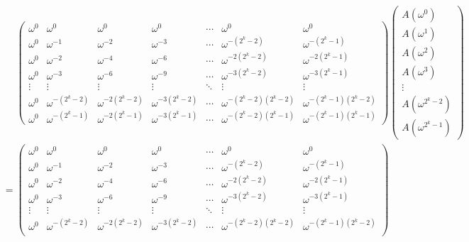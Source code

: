 \begin{align*}
&\phantom{= }
\begin{pmatrix}
\omega^0 & \omega^0 & \omega^0 & \omega^0 & \cdots & \omega^0 & \omega^0 \\ 
\omega^0 & \omega^{-1} & \omega^{-2} & \omega^{-3} & \cdots & \omega^{-(2^k-2)} & \omega^{-(2^k-1)} \\ 
\omega^0 & \omega^{-2} & \omega^{-4} & \omega^{-6} & \cdots & \omega^{-2(2^k-2)} & \omega^{-2(2^k-1)} \\ 
\omega^0 & \omega^{-3} & \omega^{-6} & \omega^{-9} & \cdots & \omega^{-3(2^k-2)} & \omega^{-3(2^k-1)} \\ 
\vdots   & \vdots   & \vdots   & \vdots   & \ddots & \vdots            & \vdots            \\
\omega^0 & \omega^{-(2^k - 2)} & \omega^{-2(2^k - 2)} & \omega^{-3(2^k - 2)} & \cdots & \omega^{-(2^k - 2)(2^k-2)} & \omega^{-(2^k-1)(2^k - 2)} \\ 
\omega^0 & \omega^{-(2^k - 1)} & \omega^{-2(2^k - 1)} & \omega^{-3(2^k - 1)} & \cdots & \omega^{-(2^k - 2)(2^k-1)} & \omega^{-(2^k-1)(2^k - 1)}
\end{pmatrix}
\begin{pmatrix}
A(\omega^0) \\ 
A(\omega^1) \\ 
A(\omega^2) \\ 
A(\omega^3) \\ 
\vdots \\
A(\omega^{2^k - 2}) \\
A(\omega^{2^k - 1})
\end{pmatrix}
\\
&=
\begin{pmatrix}
\omega^0 & \omega^0 & \omega^0 & \omega^0 & \cdots & \omega^0 & \omega^0 \\ 
\omega^0 & \omega^{-1} & \omega^{-2} & \omega^{-3} & \cdots & \omega^{-(2^k-2)} & \omega^{-(2^k-1)} \\ 
\omega^0 & \omega^{-2} & \omega^{-4} & \omega^{-6} & \cdots & \omega^{-2(2^k-2)} & \omega^{-2(2^k-1)} \\ 
\omega^0 & \omega^{-3} & \omega^{-6} & \omega^{-9} & \cdots & \omega^{-3(2^k-2)} & \omega^{-3(2^k-1)} \\ 
\vdots   & \vdots   & \vdots   & \vdots   & \ddots & \vdots            & \vdots            \\
\omega^0 & \omega^{-(2^k - 2)} & \omega^{-2(2^k - 2)} & \omega^{-3(2^k - 2)} & \cdots & \omega^{-(2^k - 2)(2^k-2)} & \omega^{-(2^k-1)(2^k - 2)} \\ 

\end{pmatrix}
\end{align*}
